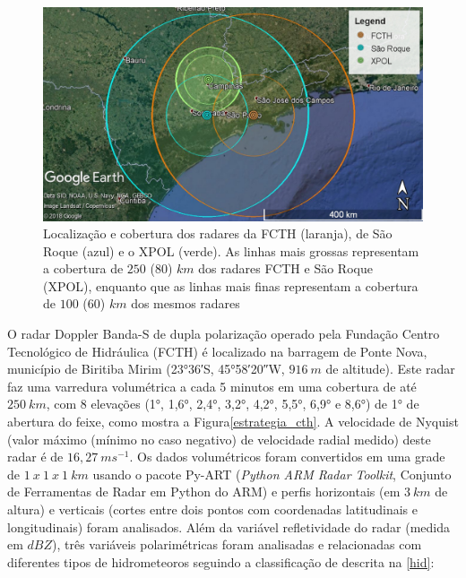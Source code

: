 \begin{figure}[htb]
	\begin{center}
		\caption{Localização e cobertura dos radares da FCTH (laranja), de São Roque (azul) e o XPOL (verde). As linhas mais grossas representam a cobertura de $250$ ($80$) $km$ dos radares FCTH e São Roque (XPOL), enquanto que as linhas mais finas representam a cobertura de $100$ ($60$) $km$ dos mesmos radares} 
		\label{cobertura_radares}
		\includegraphics[width=\columnwidth]{figs/radar_coverages_hires2.jpg}
	\end{center}
\end{figure}

O radar Doppler Banda-S de dupla polarização operado pela Fundação Centro Tecnológico de Hidráulica (FCTH) é localizado na barragem de Ponte Nova, município de Biritiba Mirim (\ang{23;36;}\:S, \ang{45;58;20}\:W, $916\:m$ de altitude). Este radar faz uma varredura volumétrica a cada 5 minutos em uma cobertura de até $250\:km$, com 8 elevações (\ang{1}, \ang{1,6}, \ang{2,4}, \ang{3,2}, \ang{4,2}, \ang{5,5}, \ang{6,9} e \ang{8,6}) de \ang{1} de abertura do feixe, como mostra a Figura\autoref{estrategia_cth}. A velocidade de Nyquist (valor máximo (mínimo no caso negativo) de velocidade radial medido) deste radar é de $16,27\:ms^{-1}$. Os dados volumétricos foram convertidos em uma grade de $1\:x\:1\:x\:1\:km$ usando o pacote Py-ART (\textit{Python ARM Radar Toolkit}, Conjunto de Ferramentas de Radar em Python do ARM) \cite{Helmus2016} e perfis horizontais (em $3\:km$ de altura) e verticais (cortes entre dois pontos com coordenadas latitudinais e longitudinais) foram analisados. Além da variável refletividade do radar (medida em $dBZ$), três variáveis polarimétricas foram analisadas e relacionadas com diferentes tipos de hidrometeoros seguindo a classificação de  descrita na \autoref{hid}:

